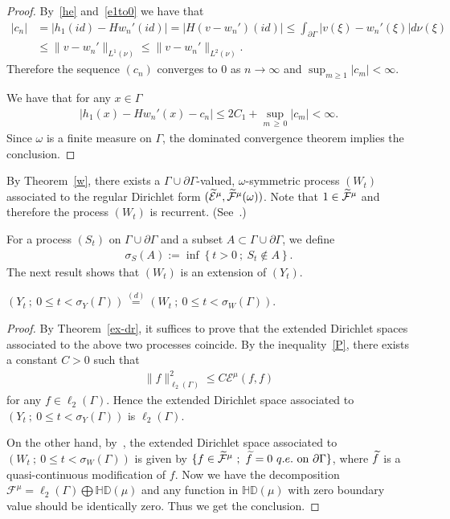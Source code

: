 \documentclass[10pt]{amsart}
\theoremstyle{definition}\newtheorem{defi}[theo]{Definition}\newtheorem{rema}[theo]{Remark}\newtheorem{exam}[theo]{Example}\newtheorem{exem}[theo]{Example}\newtheorem{nota}[theo]{Notation}
\newcommand{\ce}{\mathcal{E}}
\newcommand{\cf}{\mathcal{F}}
\newcommand{\bHD}{\mathbb{HD}}
\let\oldtilde\tilde
\renewcommand*{\tilde}[1]{\mathchoice{\widetilde{#1}}{\widetilde{#1}}{\oldtilde{#1}}{\oldtilde{#1}}}
\begin{document}
\begin{proof}
By~\eqref{he} and~\eqref{e1to0} we have that
\begin{align*}
|c_n|&=|h_1(id)-Hw_n'(id)|=|H(v-w_n')(id)|\leq \int_{\partial\Gamma} |v(\xi)-w_n'(\xi)|d\nu(\xi)\\
&\leq
\|v-w_n'\|_{L^1(\nu)}\leq
\|v-w_n'\|_{L^2(\nu)}.
\end{align*}
Therefore the sequence $(c_n)$ converges to $0$ as $n\to\infty$ and $\sup_{m\geq1}|c_m|<\infty$.



We have that for any $x\in\Gamma$
\begin{align*}
\left|h_1(x)-Hw_n'(x)-c_n\right|\leq 2C_1+\sup_{m\,\geq\,0}|c_m|<\infty.
\end{align*}
Since $\omega$ is a finite measure on $\Gamma$, the dominated convergence theorem implies the conclusion.
\end{proof}

By Theorem~\ref{w}, there exists a $\Gamma\cup\partial\Gamma$-valued, $\omega$-symmetric process $(W_t)$ associated to the regular Dirichlet form $(\tilde\ce^{\mu}, \tilde\cf^{\mu}(\omega))$. Note that $1\in\tilde\cf^{\mu}$ and therefore the process $(W_t)$ is recurrent. (See~\cite[Theorem~1.6.3]{FOT}.)



For a process $(S_t)$ on $\Gamma\cup\partial\Gamma$ and a subset $A\subset\Gamma\cup\partial\Gamma$, we define
\begin{align*}
\sigma_S(A):=\inf\left\{t>0\ ;\ S_t\notin A\right\}.
\end{align*}
The next result shows that $(W_t)$ is an extension of $(Y_t)$.

\begin{prop}\label{tau}
$(Y_t\ ;\ 0\leq t<\sigma_Y(\Gamma))\overset{(d)}{=}(W_t\ ;\ 0\leq t<\sigma_W(\Gamma)).$
\end{prop}

\begin{proof}
By Theorem~\ref{ex-dr}, it suffices to prove that the extended Dirichlet spaces associated to the above two processes coincide.
By the inequality~\eqref{P}, there exists a constant $C>0$ such that
\begin{align*}
\|f\|_{\ell_2(\Gamma)}^2\leq C\ce^{\mu}(f,f)
\end{align*}
for any $f\in\ell_2(\Gamma)$. Hence the extended Dirichlet space associated to $(Y_t\ ;\ 0\leq t<\sigma_Y(\Gamma))$ is $\ell_2(\Gamma)$.

On the other hand, by~\cite[Theorem~3.4.9]{CF}, the extended Dirichlet space associated to $(W_t\ ;\ 0\leq t<\sigma_W(\Gamma))$ is given by $\{f\in\tilde\cf^{\mu}\ ;\ \tilde{f}=0\ q.e.\ \text{on}\ \partial\Gamma\}$, where $\tilde{f}$ is a quasi-continuous modification of $f$. Now we have the decomposition $\cf^{\mu}=\ell_2(\Gamma)\bigoplus\bHD(\mu)$ and any function in $\bHD(\mu)$ with zero boundary value should be identically zero. Thus we get the conclusion.
\end{proof}
\end{document}
